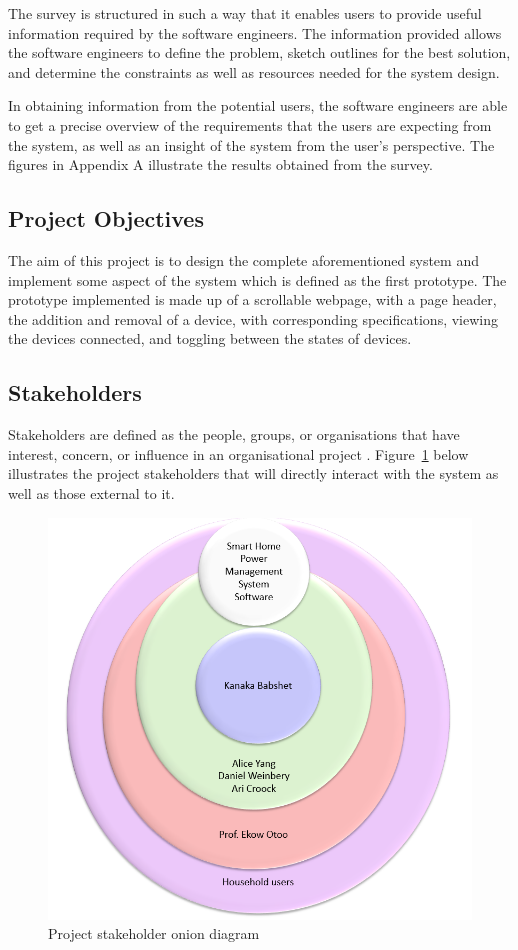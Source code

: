 \documentclass[10pt,twocolumn]{witseiepaper}
\begin{document}
	The survey is structured in such a way that it enables users to provide useful information required by the software engineers. The information provided allows the software engineers to define the problem, sketch outlines for the best solution, and determine the constraints as well as resources needed for the system design.
	
	In obtaining information from the potential users, the software engineers are able to get a precise overview of the requirements that the users are expecting from the system, as well as an insight of the system from the user's perspective. 
	\newpage
	The figures in Appendix A illustrate the results obtained from the survey.
	
	\subsection{Project Objectives}
	
	The aim of this project is to design the complete aforementioned system and implement some aspect of the system which is defined as the first prototype. The prototype implemented is made up of a scrollable webpage, with a page header, the addition and removal of a device, with corresponding specifications, viewing the devices connected, and toggling between the states of devices. 
	
	\subsection{Stakeholders}
	
	Stakeholders are defined as the people, groups, or organisations that have interest, concern, or influence in an organisational project \cite{stakeholders}. Figure~\ref{fig:stakeholders} below illustrates the project stakeholders that will directly interact with the system as well as those external to it. 
	
	\begin{figure}[H]
		\centering
		\includegraphics[width=0.75\linewidth]{stakeholders}
		\caption{Project stakeholder onion diagram}
		\label{fig:stakeholders}
	\end{figure}
\end{document}
